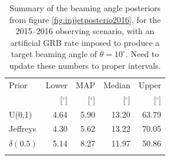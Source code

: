 \documentclass[twocolumn,nofootinbib]{revtex4-1}
\newcommand{\dwnote}[1]{{\color{dwnote}{[\textbf{DW}: #1]}}}
\renewcommand{\dwnote}{}
\begin{document}
\begin{table}
  \centering
  \begin{tabular}{lrrrr}
    \toprule
    Prior & Lower & MAP & Median & Upper\\
          & [$^\circ$] & [$^\circ$]& [$^\circ$]& [$^\circ$] \\
    \colrule
U(0,1) & 4.64	 & 5.90	 & 13.20	 & 63.79	 \\
Jeffreys & 4.30	 & 5.62	 & 13.22	 & 70.05	 \\
$\delta(0.5)$ & 5.14	 & 8.27	 & 11.97	 & 50.86	 \\
    \botrule
\end{tabular}
\caption{Summary of the beaming angle posteriors from figure
  \ref{fig:injjetposterio2016}, for the 2015--2016 observing scenario,
  with an artificial GRB rate imposed to produce a target beaming
  angle of $\theta = 10^{\circ}$.   \dwnote{Need to update these numbers to proper intervals.}}
  \label{tab:summaryinj2015}
\end{table}

%
\end{document}
